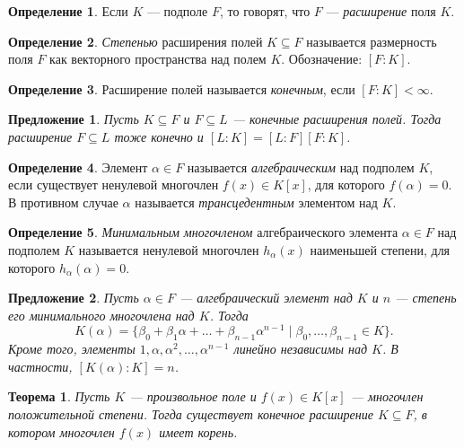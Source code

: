 \documentclass[a4paper]{article}
\theoremstyle{plain}
\newtheorem*{theorem}{Теорема}
\newtheorem{proposal}{Предложение}
\theoremstyle{definition}
\newtheorem{definition}{Определение}
\numberwithin{definition}{section}
\numberwithin{proposal}{section}
\begin{document}
\begin{definition}
Если \(K\) --- подполе \(F\), то говорят, что \(F\) --- \emph{расширение} поля \(K\).
\end{definition}

\begin{definition}
\emph{Степенью} расширения полей \(K \subseteq F\) называется размерность поля \(F\) как векторного пространства над полем \(K\). Обозначение: \([F : K]\).
\end{definition}

\begin{definition}
Расширение полей называется \emph{конечным}, если \([F : K] < \infty\). 
\end{definition}

\begin{proposal}
Пусть \(K \subseteq F\) и \(F \subseteq L\) --- конечные расширения полей. Тогда расширение \(F \subseteq L\) тоже конечно и \([L : K] = [L : F][F : K]\).
\end{proposal}

\begin{definition}
Элемент \(\alpha \in F\) называется \emph{алгебраическим} над подполем \(K\), если существует ненулевой многочлен \(f(x) \in K[x]\), для которого \(f(\alpha) = 0\). В противном случае \(\alpha\) называется \emph{трансцедентным} элементом над \(K\). 
\end{definition}

\begin{definition}
\emph{Минимальным многочленом} алгебраического элемента \(\alpha \in F\) над подполем \(K\) называется ненулевой многочлен \(h_\alpha (x)\) наименьшей степени, для которого \(h_\alpha (\alpha) = 0\).
\end{definition}

\begin{proposal}
Пусть \(\alpha \in F\) --- алгебраический элемент над \(K\) и \(n\) --- степень его минимального многочлена над \(K\). Тогда
\begin{equation*}
	K(\alpha) = \{\beta_0 + \beta_1 \alpha + \dots + \beta_{n-1}\alpha^{n-1} \;|\; \beta_0, \dots, \beta_{n-1} \in K\}.
\end{equation*}
Кроме того, элементы \(1, \alpha, \alpha^2, \dots, \alpha^{n-1}\) линейно независимы над \(K\). В частности, \([K(\alpha) : K] = n\).
\end{proposal}

\begin{theorem}
Пусть \(K\) --- произвольное поле и \(f(x) \in K[x]\) --- многочлен положительной степени. Тогда существует конечное расширение \(K \subseteq F\), в котором многочлен \(f(x)\) имеет корень.
\end{theorem}
\end{document}
